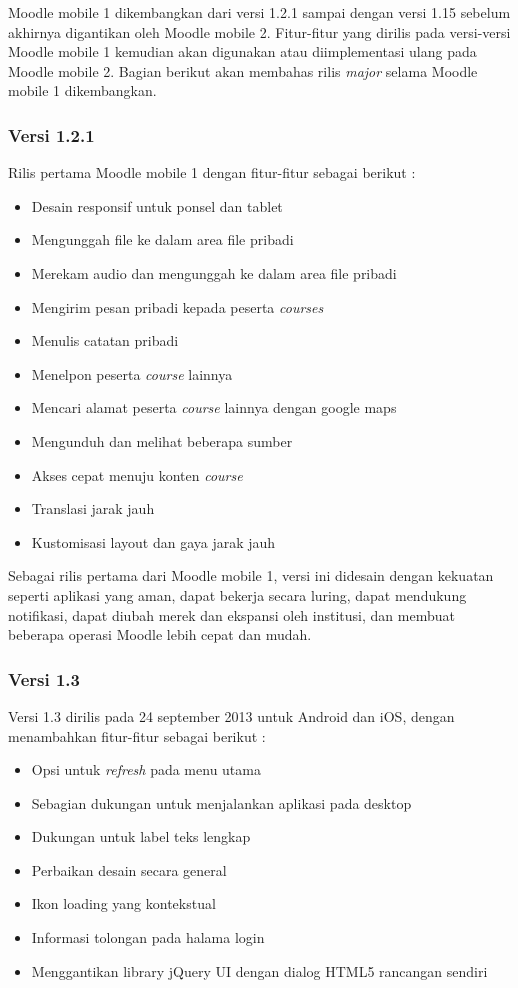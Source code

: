 Moodle mobile 1 dikembangkan dari versi 1.2.1 sampai dengan versi 1.15 sebelum akhirnya digantikan oleh Moodle mobile 2. Fitur-fitur yang dirilis pada versi-versi Moodle mobile 1 kemudian akan digunakan atau diimplementasi ulang pada Moodle mobile 2. Bagian berikut akan membahas rilis \textit{major} selama Moodle mobile 1 dikembangkan.

\subsubsection{Versi 1.2.1 }
Rilis pertama Moodle mobile 1 dengan fitur-fitur sebagai berikut  :\cite{Moodlemobile:version1:intro}
	\begin{itemize}
		\item Desain responsif untuk ponsel dan tablet
		\item Mengunggah file ke dalam area file pribadi
		\item Merekam audio dan mengunggah ke dalam area file pribadi
		\item Mengirim pesan pribadi kepada peserta \textit{courses}
		\item Menulis catatan pribadi
		\item Menelpon peserta \textit{course} lainnya
		\item Mencari alamat peserta \textit{course} lainnya dengan google maps
		\item Mengunduh dan melihat beberapa sumber 
		\item Akses cepat menuju konten \textit{course}
		\item Translasi jarak jauh
		\item Kustomisasi layout dan gaya jarak jauh
	\end{itemize}

Sebagai rilis pertama dari Moodle mobile 1, versi ini didesain dengan kekuatan seperti aplikasi yang aman, dapat bekerja secara luring, dapat mendukung notifikasi, dapat diubah merek dan ekspansi oleh institusi, dan membuat beberapa operasi Moodle lebih cepat dan mudah. \cite{Moodlemobile:version1:intro}

\subsubsection{Versi 1.3}
Versi 1.3 dirilis pada 24 september 2013 untuk Android dan iOS, dengan menambahkan fitur-fitur sebagai berikut : \cite{Moodlemobile:version1:1.3}
	\begin{itemize}
		\item Opsi untuk \textit{refresh} pada menu utama
		\item Sebagian dukungan untuk menjalankan aplikasi pada desktop
		\item Dukungan untuk label teks lengkap
		\item Perbaikan desain secara general
		\item Ikon loading yang kontekstual
		\item Informasi tolongan pada halama login
		\item Menggantikan library jQuery UI dengan dialog HTML5 rancangan sendiri 
	\end{itemize}

